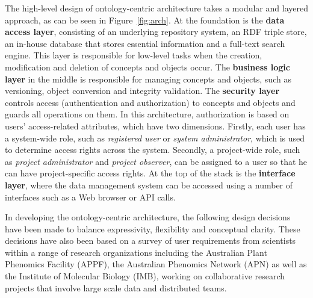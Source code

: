 \documentclass[conference,10pt]{IEEEtran}
\begin{document}
The high-level design of ontology-centric architecture takes a modular and layered approach, as can be seen in Figure~\ref{fig:arch}. At the foundation is the \textbf{data access layer}, consisting of an underlying repository system, an RDF triple store, an in-house database that stores essential information and a full-text search engine. This layer is responsible for low-level tasks when the creation, modification and deletion of concepts and objects occur. The \textbf{business logic layer} in the middle is responsible for managing concepts and objects, such as versioning, object conversion and integrity validation. The \textbf{security layer} controls access (authentication and authorization) to concepts and objects and guards all operations on them. In this architecture, authorization is based on users' access-related attributes, which have two dimensions. Firstly, each user has a system-wide role, such as \emph{registered user} or \emph{system administrator}, which is used to determine access rights across the system. Secondly, a project-wide role, such as \emph{project administrator} and \emph{project observer}, can be assigned to a user so that he can have project-specific access rights. At the top of the stack is the \textbf{interface layer}, where the data management system can be accessed using a number of interfaces such as a Web browser or API calls. 

In developing the ontology-centric architecture, the following design decisions have been made to balance expressivity, flexibility and conceptual clarity. These decisions have also been based on a survey of user requirements from scientists within a range of research organizations including the Australian Plant Phenomics Facility (APPF), the Australian Phenomics Network (APN) as well as the Institute of Molecular Biology (IMB), working on collaborative research projects that involve large scale data and distributed teams.
\end{document}
